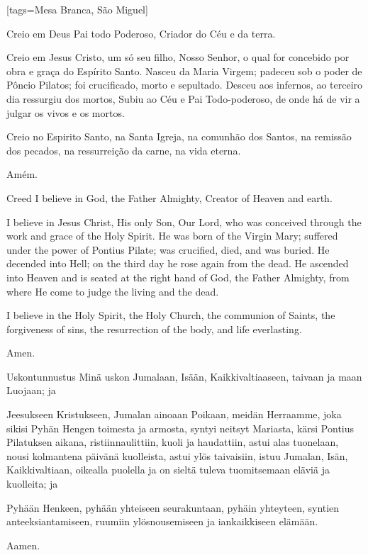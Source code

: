 [tags={Mesa Branca, São Miguel}]
  \begin{passage}[PT]{}
    Creio em Deus Pai todo Poderoso,
    Criador do Céu e da terra.
    \par
    Creio em Jesus Cristo, um só seu filho, Nosso
    Senhor, o qual for concebido por obra e graça do
    Espírito Santo. Nasceu da Maria Virgem;
    padeceu sob o poder de Pôncio Pilatos;
    foi crucificado, morto e sepultado. Desceu aos
    infernos, ao terceiro dia ressurgiu dos mortos,
    Subiu ao Céu e Pai Todo-poderoso, de onde há de vir
    a julgar os vivos e os mortos.
    \par
    Creio no Espirito Santo, na Santa Igreja,
    na comunhão dos Santos, na remissão
    dos pecados, na ressurreição da carne,
    na vida eterna.
    \par
    Amém.
  \end{passage}
  \hardbrk
  \begin{passage}[EN]{Creed}
    I believe in God, the Father Almighty,
    Creator of Heaven and earth.
    \par
    I believe in Jesus Christ, His only Son, Our Lord,
    who was conceived through the work and grace of
    the Holy Spirit. He was born of the Virgin Mary;
    suffered under the power of Pontius Pilate;
    was crucified, died, and was buried. He decended
    into Hell; on the third day he rose again from
    the dead. He ascended into Heaven and is seated
    at the right hand of God, the Father Almighty, from
    where He come to judge the living and the dead.
    \par
    I believe in the Holy Spirit, the Holy Church,
    the communion of Saints, the forgiveness of sins,
    the resurrection of the body, and life everlasting.
    \par
    Amen.
  \end{passage}
  \begin{passage}[FI]{Uskontunnustus}
    Minä uskon Jumalaan, Isään, Kaikkivaltiaaseen, taivaan ja maan Luojaan; ja
    \par
    Jeesukseen Kristukseen, Jumalan ainoaan Poikaan, meidän Herraamme,
    joka sikisi Pyhän Hengen toimesta ja armosta, syntyi neitsyt Mariasta,
    kärsi Pontius Pilatuksen aikana, ristiinnaulittiin, kuoli ja haudattiin,
    astui alas tuonelaan, nousi kolmantena päivänä kuolleista, astui ylös
    taivaisiin, istuu Jumalan, Isän, Kaikkivaltiaan, oikealla puolella ja on
    sieltä tuleva tuomitsemaan eläviä ja kuolleita; ja
    \par
    Pyhään Henkeen, pyhään yhteiseen seurakuntaan, pyhäin yhteyteen, syntien
    anteeksiantamiseen, ruumiin ylösnousemiseen ja iankaikkiseen elämään.
    \par
    Aamen.
  \end{passage}
\endsong


